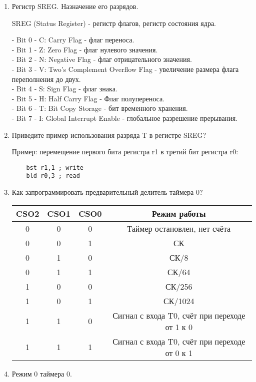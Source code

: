 \documentclass{lab}
\begin{document}
\begin{enumerate}
	\item Регистр SREG. Назначение его разрядов.
	
	SREG (Status Register) - регистр флагов, регистр состояния ядра.
	
	- Bit 0 - C: Carry Flag - флаг переноса.\\
	- Bit 1 - Z: Zero Flag - флаг нулевого значения.\\
	- Bit 2 - N: Negative Flag - флаг отрицательного значения.\\
	- Bit 3 - V: Two's Complement Overflow Flag - увеличение размера флага переполнения до двух.\\
	- Bit 4 - S: Sign Flag - флаг знака.\\
	- Bit 5 - H: Half Carry Flag - Флаг полупереноса.\\
	- Bit 6 - T: Bit Copy Storage - бит временного хранения.\\
	- Bit 7 - I: Global Interrupt Enable - глобальное разрешение прерывания.\\
	
	\item Приведите пример использования разряда T в регистре SREG?
	
	Пример: перемещение первого бита регистра r1 в третий бит регистра r0: 
	\begin{verbatim}
	bst r1,1 ; write
	bld r0,3 ; read
	\end{verbatim}
	
	\item Как запрограммировать предварительный делитель таймера 0?
	
	\begin{tabular}{|ccc|c|}
		\hline
		CSO2	&CSO1	&CSO0	&Режим работы \\ \hline
		0		&0		&0	&Таймер остановлен, нет счёта \\ \hline
		0		&0		&1		&СК	\\ \hline 
		0		&1		&0		&СК/8\\ \hline 
		0		&1		&1		&СК/64\\ \hline 
		1		&0		&0		&СК/256	\\ \hline 
		1		&0		&1		&СК/1024	\\ \hline 
		1		&1		&0		&Сигнал с входа T0, счёт при переходе от 1 к 0	\\ \hline 
		1		&1		&1		&Сигнал с входа T0, счёт при переходе от 0 к 1	\\ \hline 
	\end{tabular}
	
	
	\item Режим 0 таймера 0.
	

\end{enumerate}
\end{document}
